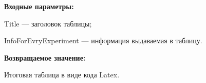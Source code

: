 \textbf{Входные параметры:}

Title --- заголовок таблицы;

InfoForEvryExperiment --- информация выдаваемая в таблицу.

\textbf{Возвращаемое значение:}

Итоговая таблица в виде кода Latex.